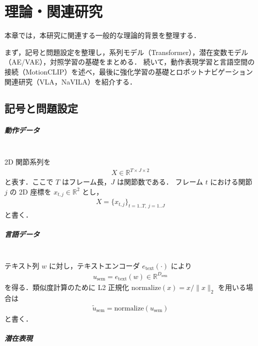 \chapter{理論・関連研究}
\label{chap:theory_related_work}

本章では，本研究に関連する一般的な理論的背景を整理する．

まず，記号と問題設定を整理し，系列モデル（Transformer），潜在変数モデル（AE/VAE），対照学習の基礎をまとめる．
続いて，動作表現学習と言語空間の接続（MotionCLIP）を述べ，最後に強化学習の基礎とロボットナビゲーション関連研究（VLA，NaVILA）を紹介する．

\section{記号と問題設定}
\label{sec:notation_problem}

\paragraph{動作データ}\leavevmode\\

2D 関節系列を
\begin{align}
  X \in \mathbb{R}^{T \times J \times 2}
\end{align}
と表す．ここで $T$ はフレーム長，$J$ は関節数である．
フレーム $t$ における関節 $j$ の 2D 座標を $x_{t,j}\in\mathbb{R}^2$ とし，
\begin{align}
  X = \{x_{t,j}\}_{t=1..T,\ j=1..J}
\end{align}
と書く．

\paragraph{言語データ}\leavevmode\\

テキスト列 $w$ に対し，テキストエンコーダ $e_{\mathrm{text}}(\cdot)$ により
\begin{align}
  u_{\mathrm{sem}} = e_{\mathrm{text}}(w) \in \mathbb{R}^{D_{\mathrm{sem}}}
\end{align}
を得る．類似度計算のために L2 正規化 $\mathrm{normalize}(x)=x/\|x\|_2$ を用いる場合は
\begin{align}
  \tilde{u}_{\mathrm{sem}}=\mathrm{normalize}(u_{\mathrm{sem}})
\end{align}
と書く．

\paragraph{潜在表現}\leavevmode\\

